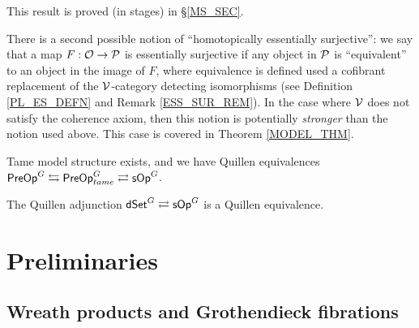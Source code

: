 \documentclass[a4paper,10pt
,draft
]{article}%
\renewcommand{\1}{\eta}%
\begin{document}
This result is proved (in stages) in \S \ref{MS_SEC}.

There is a second possible notion of ``homotopically essentially surjective'':
we say that a map $F: \O \to \P$ is essentially surjective if any object in $\P$ is ``equivalent'' to an object in the image of $F$,
where equivalence is defined used a cofibrant replacement of the $\V$-category detecting isomorphisms (see Definition \ref{PL_ES_DEFN} and Remark \ref{ESS_SUR_REM}).
In the case where $\V$ does not satisfy the coherence axiom, then this notion is potentially \textit{stronger} than the notion used above.
This case is covered in Theorem \ref{MODEL_THM}.



\begin{theorem}
      Tame model structure exists, and we have Quillen equivalences
      $\mathsf{PreOp}^G \leftrightarrows \mathsf{PreOp}^G_{tame} \rightleftarrows \sOp^G$.
\end{theorem}

\begin{theorem}
      The Quillen adjunction $\dSet^G \rightleftarrows \sOp^G$ is a Quillen equivalence.
\end{theorem}

\section{Preliminaries}

\subsection{Wreath products and Grothendieck fibrations}

\end{document}
